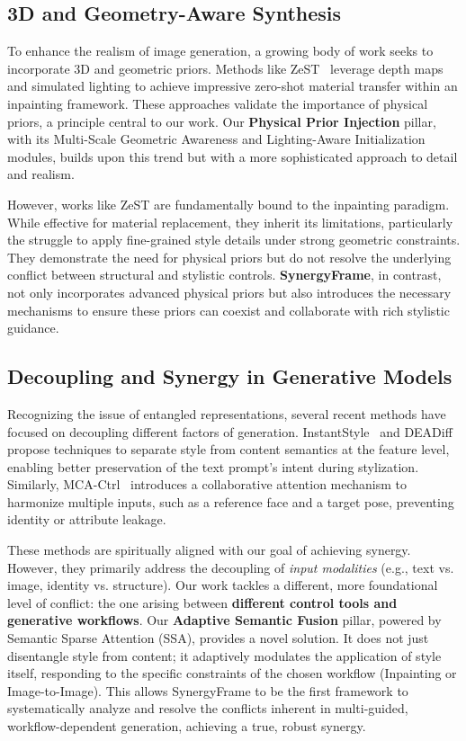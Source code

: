 \documentclass[letterpaper]{article} %
\begin{document}
\subsection{3D and Geometry-Aware Synthesis}

To enhance the realism of image generation, a growing body of work seeks to incorporate 3D and geometric priors. Methods like ZeST~\cite{zest} leverage depth maps and simulated lighting to achieve impressive zero-shot material transfer within an inpainting framework. These approaches validate the importance of physical priors, a principle central to our work. Our \textbf{Physical Prior Injection} pillar, with its Multi-Scale Geometric Awareness and Lighting-Aware Initialization modules, builds upon this trend but with a more sophisticated approach to detail and realism.

However, works like ZeST are fundamentally bound to the inpainting paradigm. While effective for material replacement, they inherit its limitations, particularly the struggle to apply fine-grained style details under strong geometric constraints. They demonstrate the need for physical priors but do not resolve the underlying conflict between structural and stylistic controls. \textbf{SynergyFrame}, in contrast, not only incorporates advanced physical priors but also introduces the necessary mechanisms to ensure these priors can coexist and collaborate with rich stylistic guidance.

\subsection{Decoupling and Synergy in Generative Models}

Recognizing the issue of entangled representations, several recent methods have focused on decoupling different factors of generation. InstantStyle~\cite{instantstyle} and DEADiff~\cite{deadiff} propose techniques to separate style from content semantics at the feature level, enabling better preservation of the text prompt's intent during stylization. Similarly, MCA-Ctrl~\cite{mca-ctrl} introduces a collaborative attention mechanism to harmonize multiple inputs, such as a reference face and a target pose, preventing identity or attribute leakage.

These methods are spiritually aligned with our goal of achieving synergy. However, they primarily address the decoupling of \textit{input modalities} (e.g., text vs. image, identity vs. structure). Our work tackles a different, more foundational level of conflict: the one arising between \textbf{different control tools and generative workflows}. Our \textbf{Adaptive Semantic Fusion} pillar, powered by Semantic Sparse Attention (SSA), provides a novel solution. It does not just disentangle style from content; it adaptively modulates the application of style itself, responding to the specific constraints of the chosen workflow (Inpainting or Image-to-Image). This allows SynergyFrame to be the first framework to systematically analyze and resolve the conflicts inherent in multi-guided, workflow-dependent generation, achieving a true, robust synergy.
\end{document}
